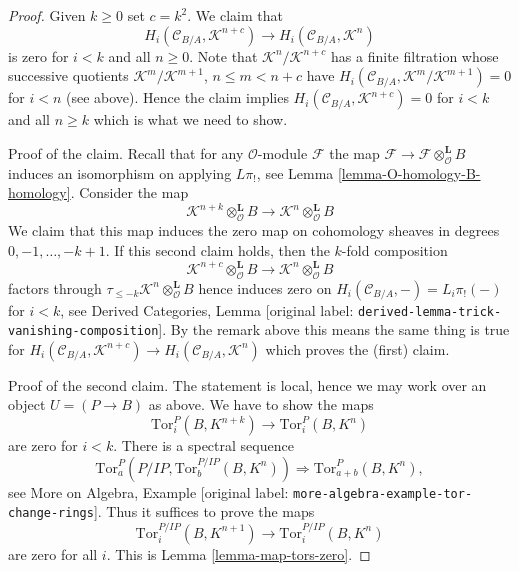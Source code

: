 \documentclass[10pt,a4paper]{article}
\theoremstyle{plain}
\theoremstyle{definition}
\theoremstyle{remark}
\numberwithin{equation}{subsection}
\begin{document}
\begin{proof}
\medskip\noindent
Given $k \geq 0$ set $c = k^2$. We claim that
$$
H_i(\mathcal{C}_{B/A}, \mathcal{K}^{n + c}) \to
H_i(\mathcal{C}_{B/A}, \mathcal{K}^n)
$$
is zero for $i < k$ and all $n \geq 0$. Note that
$\mathcal{K}^n/\mathcal{K}^{n + c}$ has a finite filtration whose successive
quotients $\mathcal{K}^m/\mathcal{K}^{m + 1}$, $n \leq m < n + c$
have $H_i(\mathcal{C}_{B/A}, \mathcal{K}^m/\mathcal{K}^{m + 1}) = 0$
for $i < n$ (see above). Hence the claim implies
$H_i(\mathcal{C}_{B/A}, \mathcal{K}^{n + c}) = 0$ for $i < k$ and all
$n \geq k$ which is what we need to show.

\medskip\noindent
Proof of the claim. Recall that for any $\mathcal{O}$-module $\mathcal{F}$
the map $\mathcal{F} \to \mathcal{F} \otimes_\mathcal{O}^\mathbf{L} B$
induces an isomorphism on applying $L\pi_!$, see
Lemma \ref{lemma-O-homology-B-homology}.
Consider the map
$$
\mathcal{K}^{n + k} \otimes_\mathcal{O}^\mathbf{L} B
\longrightarrow
\mathcal{K}^n \otimes_\mathcal{O}^\mathbf{L} B
$$
We claim that this map induces the zero map on cohomology sheaves
in degrees $0, -1, \ldots, - k + 1$. If this second claim holds, then
the $k$-fold composition
$$
\mathcal{K}^{n + c} \otimes_\mathcal{O}^\mathbf{L} B
\longrightarrow
\mathcal{K}^n \otimes_\mathcal{O}^\mathbf{L} B
$$
factors through $\tau_{\leq -k}\mathcal{K}^n \otimes_\mathcal{O}^\mathbf{L} B$
hence induces zero on $H_i(\mathcal{C}_{B/A}, -) = L_i\pi_!( - )$
for $i < k$, see
Derived Categories, Lemma \textnormal{[original label: \nolinkurl{derived-lemma-trick-vanishing-composition}]}.
By the remark above this means the same thing is true for
$H_i(\mathcal{C}_{B/A}, \mathcal{K}^{n + c}) \to
H_i(\mathcal{C}_{B/A}, \mathcal{K}^n)$
which proves the (first) claim.

\medskip\noindent
Proof of the second claim. The statement is local, hence we may work
over an object $U = (P \to B)$ as above. We have to show
the maps
$$
\text{Tor}_i^P(B, K^{n + k}) \to \text{Tor}_i^P(B, K^n)
$$
are zero for $i < k$. There is a spectral sequence
$$
\text{Tor}_a^P(P/IP, \text{Tor}_b^{P/IP}(B, K^n))
\Rightarrow
\text{Tor}_{a + b}^P(B, K^n),
$$
see More on Algebra, Example \textnormal{[original label: \nolinkurl{more-algebra-example-tor-change-rings}]}.
Thus it suffices to prove the maps
$$
\text{Tor}_i^{P/IP}(B, K^{n + 1}) \to \text{Tor}_i^{P/IP}(B, K^n)
$$
are zero for all $i$. This is Lemma \ref{lemma-map-tors-zero}.
\end{proof}
\end{document}
